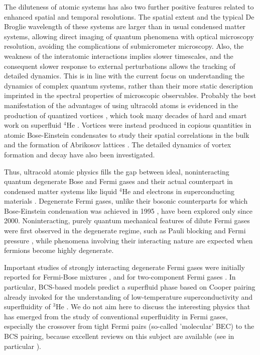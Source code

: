 \documentclass[pra,letterpaper,twocolumn,showpacs,superscriptaddress]{revtex4}
\begin{document}
The diluteness of atomic systems has also two further positive features related to enhanced spatial and temporal resolutions. 
The spatial extent and the typical De Broglie wavelength of these systems are larger than in usual condensed matter systems, allowing 
direct imaging of quantum phenomena with optical microscopy resolution, avoiding the complications of submicrometer microscopy. 
Also, the weakness of the interatomic interactions implies slower timescales, and the consequent slower response to external perturbations 
allows the tracking of detailed dynamics. This is in line with the current focus on understanding the dynamics of complex quantum systems, rather 
than their more static description imprinted in the spectral properties of microscopic observables. Probably the best manifestation of the advantages 
of using ultracold atoms is evidenced in the production of quantized vortices \cite{Fetter2001,Fetter2009}, which took many decades of hard and smart 
work on superfluid ${}^4$He \cite{Hall1956,Hess1967,Packard1969,Packard1972}. Vortices were instead produced in copious quantities in atomic 
Bose-Einstein condensates \cite{Aboshaeer2001} to study their spatial correlations in the bulk and the formation of Abrikosov lattices \cite{Abrikosov1957}.
The detailed dynamics of vortex formation \cite{Raman2001} and decay \cite{Aboshaeer2002} have also been investigated. 

Thus, ultracold atomic physics fills the gap between ideal, noninteracting quantum degenerate Bose and Fermi 
gases and their actual counterpart in condensed matter systems like liquid $^4$He and electrons in superconducting 
materials \cite{Pethick2002,Pitaevskii2003}. Degenerate Fermi gases, unlike their bosonic counterparts for which Bose-Einstein 
condensation was achieved in 1995  \cite{Wieman1995,Davis1995,Bradley1995}, have been explored only since 2000. 
Noninteracting, purely quantum mechanical features of dilute Fermi gases were first observed in the degenerate regime, such as 
Pauli blocking \cite{DeMarco1999} and Fermi pressure \cite{Truscott2001,Schreck2001b}, while phenomena involving their interacting 
nature are expected when fermions become highly degenerate. 

Important studies of strongly interacting degenerate Fermi gases were initially reported for Fermi-Bose mixtures 
\cite{Goldwin2001,Modugno2001,Modugno2002,Roati2002}, and for two-component Fermi gases \cite{Ohara2002}. 
In particular, BCS-based models predict a superfluid phase based on Cooper pairing already invoked for the understanding 
of low-temperature superconductivity and superfluidity of $^3$He \cite{Stoof1996}. 
We do not aim here to discuss the interesting physics that has emerged from the study of conventional superfluidity 
in Fermi gases, especially the crossover from tight Fermi pairs (so-called 'molecular' BEC) to the BCS pairing, because   
excellent reviews on this subject are available (see in particular \cite{Chen2005,Giorgini2008,Ketterle2008}).
\end{document}
